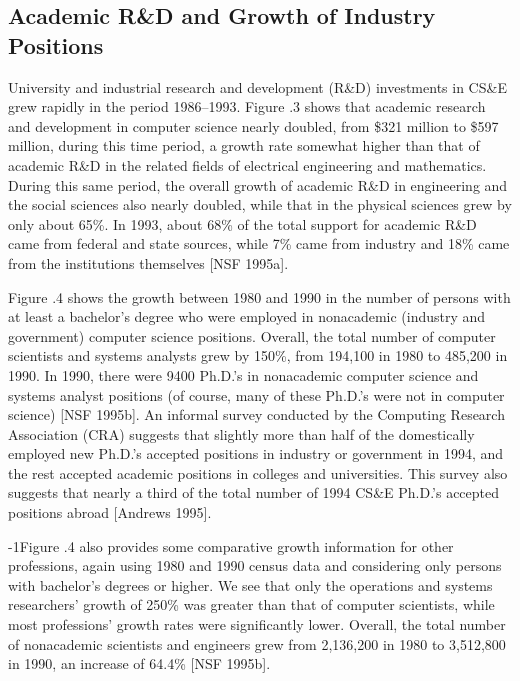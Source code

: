 \enlargethispage{-1pc}
\subsection[Academic R\&D and Growth of Industry Positions]{Academic R\&D and Growth of Industry Positions}

University and industrial research and development (R\&D)
investments in CS\&E grew rapidly in the period 1986--1993. Figure
{\thechapter}.3 shows that academic research and development in computer
science nearly doubled, from \$321 million to \$597 million, during
this time period, a growth rate somewhat higher than that of
academic R\&D in the related fields of electrical engineering and
mathematics. During this same period, the overall growth of
academic R\&D in engineering and the social sciences also nearly
doubled, while that in the physical sciences grew by only about
65\%. In 1993, about 68\% of the total support for academic R\&D
came from federal and state sources, while 7\% came from industry
and 18\% came from the institutions themselves [NSF 1995a].

Figure {\thechapter}.4 shows the growth between 1980 and 1990 in the number of
persons with at least a bachelor's degree who were employed in
nonacademic (industry and government) computer science
positions. Overall, the total number of computer scientists and
systems analysts grew by 150\%, from 194,100 in 1980 to 485,200
in 1990. In 1990, there were 9400 Ph.D.'s in nonacademic computer
science and systems analyst positions (of course, many of these
Ph.D.'s were not in computer science) [NSF 1995b]. An informal
survey conducted by the Computing Research Association (CRA)
suggests that slightly more than half of the domestically
employed new Ph.D.'s accepted positions in industry or government
in 1994, and the rest accepted academic positions in colleges
and universities. This survey also suggests that nearly a third
of the total number of 1994 CS\&E Ph.D.'s accepted positions abroad
[Andrews 1995].


\looseness-1Figure {\thechapter}.4 also provides some comparative growth information for
other professions, again using 1980 and 1990 census data and
considering only persons with bachelor's degrees or higher. We
see that only the operations and systems researchers' growth of
250\% was greater than that of computer scientists, while most
professions' growth rates were significantly lower. Overall, the
total number of nonacademic scientists and engineers grew from
2,136,200 in 1980 to 3,512,800  in 1990, an increase of 64.4\% [NSF 1995b].

